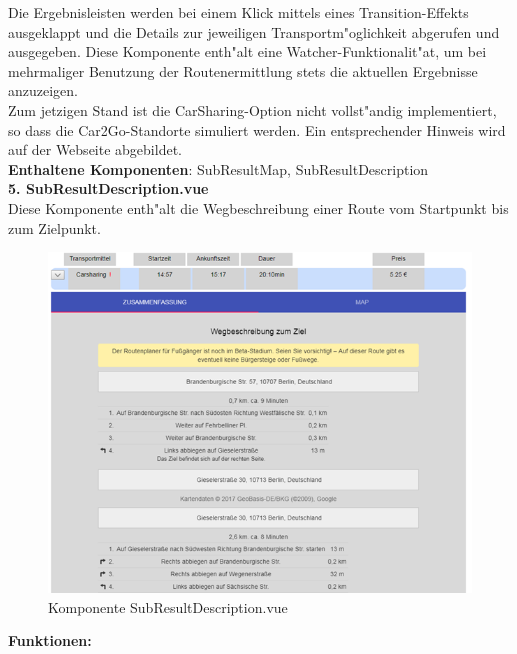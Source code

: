\documentclass[a4paper, 11pt]{scrreprt}
\begin{document}
Die Ergebnisleisten werden bei einem Klick mittels eines Transition-Effekts ausgeklappt und die Details zur jeweiligen Transportm"oglichkeit abgerufen und ausgegeben. Diese Komponente enth"alt eine Watcher-Funktionalit"at, um bei mehrmaliger Benutzung der Routenermittlung stets die aktuellen Ergebnisse anzuzeigen. \\

Zum jetzigen Stand ist die CarSharing-Option nicht vollst"andig implementiert, so dass die Car2Go-Standorte simuliert werden. Ein entsprechender Hinweis wird auf der Webseite abgebildet.\\

\textbf{Enthaltene Komponenten}: SubResultMap, SubResultDescription\\

\textbf{5. SubResultDescription.vue}\\

Diese Komponente enth"alt die Wegbeschreibung einer Route vom Startpunkt bis zum Zielpunkt.\\


\begin{figure} [H]
\begin{center}
\includegraphics[scale=1]{SubResultDescription.png}
\caption{Komponente SubResultDescription.vue}
\label{SubResultDescription}
\end{center}
\end{figure}

\textbf{Funktionen:}\\
\end{document}
